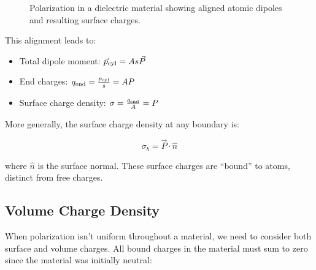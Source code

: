 \documentclass[
  a4paper,
]{book}
\providecommand{\tightlist}{%
  \setlength{\itemsep}{0pt}\setlength{\parskip}{0pt}}
\begin{document}
\begin{figure}


\caption{\label{fig-sample}Polarization in a dielectric material showing
aligned atomic dipoles and resulting surface charges.}

\end{figure}%

This alignment leads to:

\begin{itemize}
\tightlist
\item
  Total dipole moment: \(\vec{p}_{\rm cyl}=A s \vec{P}\)
\item
  End charges: \(q_{\rm end}=\frac{p_{\rm cyl}}{s}=A P\)
\item
  Surface charge density: \(\sigma=\frac{q_{\rm end}}{A}=P\)
\end{itemize}

More generally, the surface charge density at any boundary is:

\[
\sigma_b=\vec{P}\cdot\hat{n}
\]

where \(\hat{n}\) is the surface normal. These surface charges are
``bound'' to atoms, distinct from free charges.

\subsection{Volume Charge Density}\label{volume-charge-density}

When polarization isn't uniform throughout a material, we need to
consider both surface and volume charges. All bound charges in the
material must sum to zero since the material was initially neutral:
\end{document}

